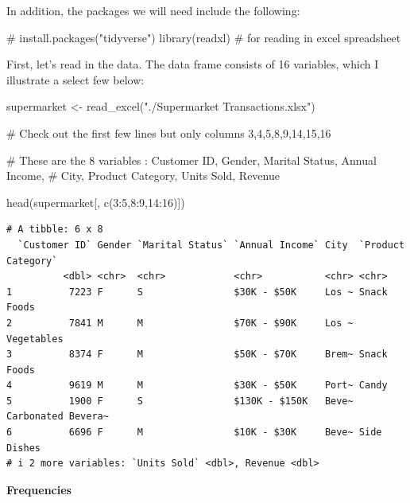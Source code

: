 \documentclass[
  letterpaper,
  DIV=11,
  numbers=noendperiod]{scrreprt}
\newenvironment{Shaded}{\begin{snugshade}}{\end{snugshade}}
\newcommand{\CommentTok}[1]{\textcolor[rgb]{0.37,0.37,0.37}{#1}}
\newcommand{\DecValTok}[1]{\textcolor[rgb]{0.68,0.00,0.00}{#1}}
\newcommand{\FunctionTok}[1]{\textcolor[rgb]{0.28,0.35,0.67}{#1}}
\newcommand{\NormalTok}[1]{\textcolor[rgb]{0.00,0.23,0.31}{#1}}
\newcommand{\OtherTok}[1]{\textcolor[rgb]{0.00,0.23,0.31}{#1}}
\newcommand{\SpecialCharTok}[1]{\textcolor[rgb]{0.37,0.37,0.37}{#1}}
\newcommand{\StringTok}[1]{\textcolor[rgb]{0.13,0.47,0.30}{#1}}
\begin{document}
In addition, the packages we will need include the following:

\begin{Shaded}
\begin{Highlighting}[]
\CommentTok{\# install.packages("tidyverse")}
\FunctionTok{library}\NormalTok{(readxl)                   }\CommentTok{\# for reading in excel spreadsheet}
\end{Highlighting}
\end{Shaded}

First, let's read in the data. The data frame consists of 16 variables,
which I illustrate a select few below:

\begin{Shaded}
\begin{Highlighting}[]
\NormalTok{supermarket }\OtherTok{\textless{}{-}} \FunctionTok{read\_excel}\NormalTok{(}\StringTok{"./Supermarket Transactions.xlsx"}\NormalTok{)}

\CommentTok{\# Check out the first few lines but only columns 3,4,5,8,9,14,15,16}

\CommentTok{\# These are the 8 variables : Customer ID, Gender, Marital Status, Annual Income,}
\CommentTok{\# City, Product Category, Units Sold, Revenue}

\FunctionTok{head}\NormalTok{(supermarket[, }\FunctionTok{c}\NormalTok{(}\DecValTok{3}\SpecialCharTok{:}\DecValTok{5}\NormalTok{,}\DecValTok{8}\SpecialCharTok{:}\DecValTok{9}\NormalTok{,}\DecValTok{14}\SpecialCharTok{:}\DecValTok{16}\NormalTok{)])}
\end{Highlighting}
\end{Shaded}

\begin{verbatim}
# A tibble: 6 x 8
  `Customer ID` Gender `Marital Status` `Annual Income` City  `Product Category`
          <dbl> <chr>  <chr>            <chr>           <chr> <chr>             
1          7223 F      S                $30K - $50K     Los ~ Snack Foods       
2          7841 M      M                $70K - $90K     Los ~ Vegetables        
3          8374 F      M                $50K - $70K     Brem~ Snack Foods       
4          9619 M      M                $30K - $50K     Port~ Candy             
5          1900 F      S                $130K - $150K   Beve~ Carbonated Bevera~
6          6696 F      M                $10K - $30K     Beve~ Side Dishes       
# i 2 more variables: `Units Sold` <dbl>, Revenue <dbl>
\end{verbatim}

\textbf{Frequencies}
\end{document}

